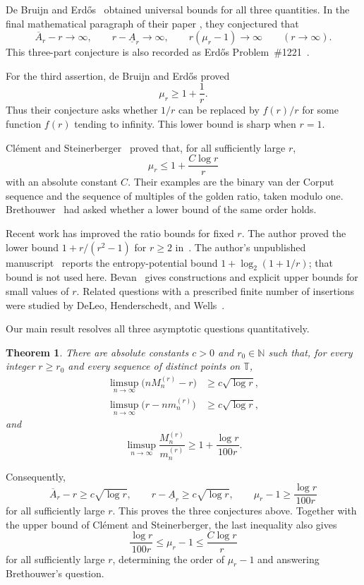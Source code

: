 \documentclass[11pt]{article}
\newtheorem{theorem}{Theorem}[section]
\theoremstyle{remark}
\numberwithin{equation}{section}
\newcommand{\T}{\mathbb{T}}
\newcommand{\N}{\mathbb{N}}
\begin{document}
De Bruijn and Erd\H{o}s~\cite{debruijn-erdos} obtained universal bounds for
all three quantities. In the final mathematical paragraph of their paper
\cite[p.~17]{debruijn-erdos}, they conjectured that
\[
  \overline A_r-r\longrightarrow\infty,
  \qquad
  r-\underline A_r\longrightarrow\infty,
  \qquad
  r(\mu_r-1)\longrightarrow\infty
  \qquad(r\to\infty).
\]
This three-part conjecture is also recorded as Erd\H{o}s
Problem~\#1221~\cite{erdos-problem-1221}.

For the third assertion, de Bruijn and Erd\H{o}s proved
\[
  \mu_r\geq1+\frac1r.
\]
Thus their conjecture asks whether $1/r$ can be replaced by $f(r)/r$ for
some function $f(r)$ tending to infinity. This lower bound is sharp when
$r=1$.

Cl\'ement and Steinerberger~\cite{clement-steinerberger} proved that, for all
sufficiently large $r$,
\[
  \mu_r\leq1+\frac{C\log r}{r}
\]
with an absolute constant $C$. Their examples are the binary van der Corput
sequence and the sequence of multiples of the golden ratio, taken modulo
one. Brethouwer~\cite[Section~3.3.1, Question~3]{brethouwer} had asked whether
a lower bound of the same order holds.

Recent work has improved the ratio bounds for fixed $r$. The author proved the
lower bound $1+r/(r^2-1)$ for $r\geq2$ in~\cite{korsky}. The author's
unpublished manuscript~\cite{korsky-entropy} reports the entropy-potential
bound $1+\log_2(1+1/r)$; that bound is not used here. Bevan~\cite{bevan}
gives constructions and explicit upper bounds for small values of $r$.
Related questions with a prescribed finite number of insertions were
studied by DeLeo, Henderschedt, and Wells~\cite{deleo-henderschedt-wells}.

Our main result resolves all three asymptotic questions quantitatively.
\begin{theorem}\label{thm:main}
There are absolute constants $c>0$ and $r_0\in\N$ such that, for every
integer $r\geq r_0$
and every sequence of distinct points on $\T$,
\begin{align*}
  \limsup_{n\to\infty}\bigl(nM_n^{(r)}-r\bigr)
  &\geq c\sqrt{\log r},\\
  \limsup_{n\to\infty}\bigl(r-nm_n^{(r)}\bigr)
  &\geq c\sqrt{\log r},
\end{align*}
and
\[
  \limsup_{n\to\infty}\frac{M_n^{(r)}}{m_n^{(r)}}
  \geq1+\frac{\log r}{100r}.
\]
\end{theorem}
Consequently,
\[
  \overline A_r-r\geq c\sqrt{\log r},
  \qquad
  r-\underline A_r\geq c\sqrt{\log r},
  \qquad
  \mu_r-1\geq\frac{\log r}{100r}
\]
for all sufficiently large $r$. This proves the three conjectures above.
Together with the upper bound of Cl\'ement and Steinerberger, the last
inequality also gives
\[
  \frac{\log r}{100r}\leq\mu_r-1\leq\frac{C\log r}{r}
\]
for all sufficiently large $r$, determining the order of $\mu_r-1$ and
answering Brethouwer's question.
\end{document}
